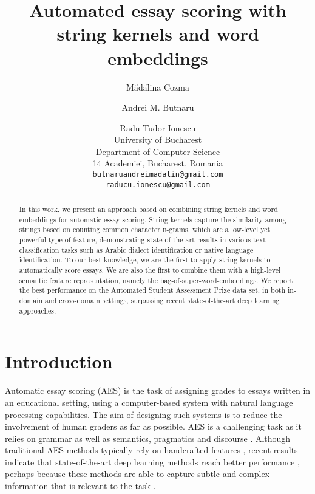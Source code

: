 \documentclass[11pt,a4paper]{article}
\title{Automated essay scoring with string kernels and word embeddings}
\author{M\u{a}d\u{a}lina Cozma \and Andrei M. Butnaru \and {Radu Tudor} Ionescu\\
  University of Bucharest\\
  Department of Computer Science\\
  14 Academiei, Bucharest, Romania\\
  {\tt butnaruandreimadalin@gmail.com}\\
  {\tt raducu.ionescu@gmail.com}
}
\date{}
\begin{document}
\maketitle
\begin{abstract}
In this work, we present an approach based on combining string kernels and word embeddings for automatic essay scoring. String kernels capture the similarity among strings based on counting common character n-grams, which are a low-level yet powerful type of feature, demonstrating state-of-the-art results in various text classification tasks such as Arabic dialect identification or native language identification. To our best knowledge, we are the first to apply string kernels to automatically score essays. We are also the first to combine them with a high-level semantic feature representation, namely the bag-of-super-word-embeddings. We report the best performance on the Automated Student Assessment Prize data set, in both in-domain and cross-domain settings, surpassing recent state-of-the-art deep learning approaches.
\end{abstract}

\setlength{\abovedisplayskip}{3pt}
\setlength{\belowdisplayskip}{3pt}

\section{Introduction}

Automatic essay scoring (AES) is the task of assigning grades to essays written in an educational setting, using a computer-based system with natural language processing capabilities. The aim of designing such systems is to reduce the involvement of human graders as far as possible. AES is a challenging task as it relies on grammar as well as semantics, pragmatics and discourse \cite{Song-ACL-2017}. Although traditional AES methods typically rely on handcrafted features \cite{Larkey-SIGIR-1998,Foltz-EdMedia-1999,Attali-JTLA-2006,Dikli-JTLA-2006,Wang-CITTE-2008,Chen-EMNLP-2013,Somasumdaran-COLING-2014,Yannakoudakis-ACL-2014,Phandi-EMNLP-2015}, recent results indicate that state-of-the-art deep learning methods reach better performance \cite{Alikaniotis-ACL-2016,Dong-EMNLP-2016,Taghipour-EMNLP-2016,Dong-CONLL-2017,Song-ACL-2017,Tay-ACL-2018}, perhaps because these methods are able to capture subtle and complex information that is relevant to the task \cite{Dong-EMNLP-2016}.
\end{document}
